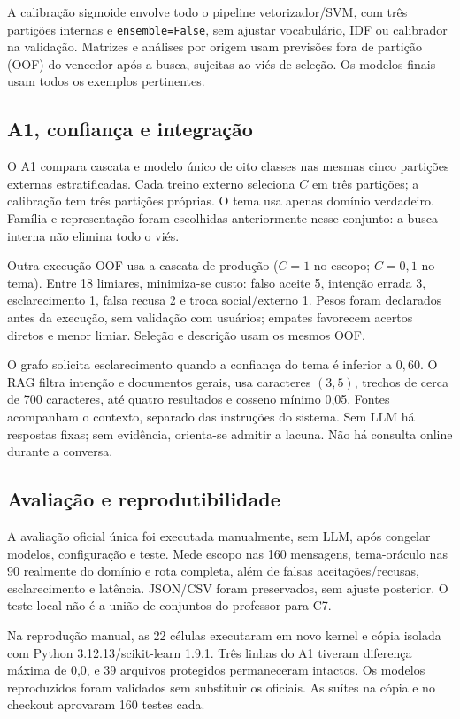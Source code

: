 \documentclass[12pt]{article}
\begin{document}
A calibração sigmoide envolve todo o pipeline vetorizador/SVM, com três
partições internas e \texttt{ensemble=False}, sem ajustar vocabulário, IDF ou
calibrador na validação. Matrizes e análises por origem usam previsões
fora de partição (OOF) do vencedor após a busca, sujeitas ao viés de seleção.
Os modelos finais usam todos os exemplos pertinentes.

\subsection{A1, confiança e integração}
O A1 compara cascata e modelo único de oito classes nas mesmas cinco partições
externas estratificadas. Cada treino externo seleciona \(C\) em três partições;
a calibração tem três partições próprias. O tema usa apenas domínio verdadeiro.
Família e representação foram escolhidas anteriormente nesse conjunto:
a busca interna não elimina todo o viés.

Outra execução OOF usa a cascata de produção (\(C=1\) no escopo;
\(C=0{,}1\) no tema). Entre 18 limiares, minimiza-se custo: falso aceite 5,
intenção errada 3, esclarecimento 1, falsa recusa 2 e troca social/externo 1.
Pesos foram declarados antes da execução, sem validação com usuários;
empates favorecem acertos diretos e menor limiar. Seleção e descrição usam
os mesmos OOF.

O grafo solicita esclarecimento quando a confiança do tema é inferior a
\(0{,}60\). O RAG filtra intenção e documentos gerais, usa caracteres $(3,5)$,
trechos de cerca de 700 caracteres, até quatro resultados e cosseno mínimo 0,05.
Fontes acompanham o contexto, separado das instruções do sistema.
Sem LLM há respostas fixas; sem evidência, orienta-se admitir a lacuna.
Não há consulta online durante a conversa.

\subsection{Avaliação e reprodutibilidade}
A avaliação oficial única foi executada manualmente, sem LLM, após congelar
modelos, configuração e teste. Mede escopo nas 160 mensagens, tema-oráculo nas
90 realmente do domínio e rota completa, além de falsas aceitações/recusas,
esclarecimento e latência. JSON/CSV foram preservados, sem ajuste posterior.
O teste local não é a união de conjuntos do professor para C7.

Na reprodução manual, as 22 células executaram em novo kernel e cópia isolada com Python 3.12.13/scikit-learn 1.9.1. Três linhas do A1 tiveram diferença máxima de 0,0, e 39 arquivos protegidos permaneceram intactos. Os modelos reproduzidos foram validados sem substituir os oficiais. As suítes na cópia e no checkout aprovaram 160 testes cada.
\end{document}
